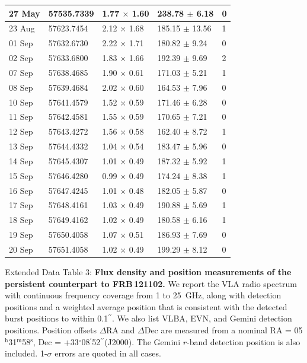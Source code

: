 \documentclass{nature_frb}
\newcommand{\frb}{FRB\,121102}
\newcommand{\arcsec}{\ensuremath{^{\prime\prime}}}
\newcommand{\arcmin}{\ensuremath{^{\prime}}}
\newcommand{\degree}{\ensuremath{^\circ}}
\newcommand{\hs}{\ensuremath{^{\mathrm{s}}}}
\newcommand{\hm}{\ensuremath{^{\mathrm{m}}}}
\newcommand{\hh}{\ensuremath{^{\mathrm{h}}}}
\begin{document}
\begin{table}
\begin{tabular}{lllll}
27 May & 57535.7339  & 1.77 $\times$ 1.60 &238.78  $\pm$  6.18  & 0   \\ \hline
23 Aug & 57623.7454  & 2.12 $\times$ 1.68 &185.15  $\pm$  13.56  & 1  \\
01 Sep & 57632.6730  & 2.22 $\times$ 1.71 &180.82  $\pm$  9.24  & 0   \\
02 Sep & 57633.6800  & 1.83 $\times$ 1.66 &192.39  $\pm$  9.69  & 2   \\
07 Sep & 57638.4685  & 1.90 $\times$ 0.61 &171.03  $\pm$  5.21  & 1   \\
08 Sep & 57639.4684  & 2.02 $\times$ 0.60 &164.53  $\pm$  7.96  & 0   \\
10 Sep & 57641.4579  & 1.52 $\times$ 0.59 &171.46  $\pm$  6.28  & 0   \\
11 Sep & 57642.4581  & 1.55 $\times$ 0.59 &170.65  $\pm$  7.21  & 0   \\
12 Sep & 57643.4272  & 1.56 $\times$ 0.58 &162.40  $\pm$  8.72  & 1   \\
13 Sep & 57644.4332  & 1.04 $\times$ 0.54 &183.47  $\pm$  5.96  & 0   \\
14 Sep & 57645.4307  & 1.01 $\times$ 0.49 &187.32  $\pm$  5.92  & 1   \\
15 Sep & 57646.4280  & 0.99 $\times$ 0.49 &174.24  $\pm$  8.38  & 1   \\
16 Sep & 57647.4245  & 1.01 $\times$ 0.48 &182.05  $\pm$  5.87  & 0   \\
17 Sep & 57648.4161  & 1.03 $\times$ 0.49 &190.88  $\pm$  5.69  & 1   \\
18 Sep & 57649.4162  & 1.02 $\times$ 0.49 &180.58  $\pm$  6.16  & 1   \\
19 Sep & 57650.4058  & 1.07 $\times$ 0.51 &186.93  $\pm$  7.69  & 0   \\
20 Sep & 57651.4058  & 1.02 $\times$ 0.49 &199.29  $\pm$  8.12  & 0   \\
\hline
\hline
\end{tabular}
\end{table}



\clearpage
\bigskip\noindent
Extended Data Table 3: {\bf Flux density and position measurements of the persistent counterpart to \frb.} We report the VLA radio spectrum with continuous frequency coverage from 1 to 25~GHz, along with detection positions and a weighted average position that is consistent with the detected burst positions to within 0.1\arcsec. We also list VLBA, EVN, and Gemini detection positions.
Position offsets $\Delta$RA and $\Delta$Dec are measured from a nominal RA = 05\hh31\hm58\hs, Dec = +33\degree08\arcmin52\arcsec (J2000).
The Gemini $r$-band detection position is also included.
1-$\sigma$ errors are quoted in all cases.
\end{document}
